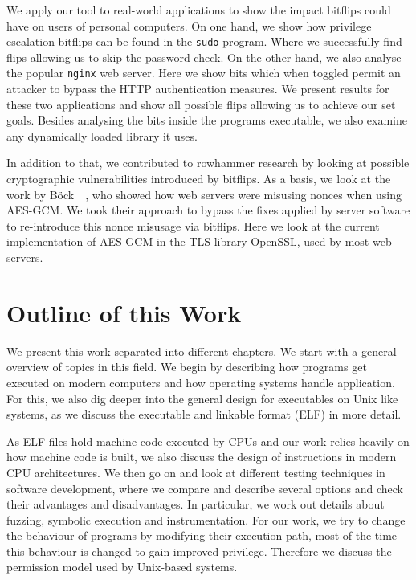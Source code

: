 We apply our tool to real-world applications to show the impact bitflips could
have on users of personal computers. On one hand, we show how privilege
escalation bitflips can be found in the \texttt{sudo} program. Where we
successfully find flips allowing us to skip the password check. On the other
hand, we also analyse the popular \texttt{nginx} web server. Here we show bits
which when toggled permit an attacker to bypass the HTTP authentication
measures. We present results for these two applications and show all possible
flips allowing us to achieve our set goals. Besides analysing the bits inside
the program\textquotesingle s executable, we also examine any dynamically loaded
library it uses.

In addition to that, we contributed to rowhammer research by looking at possible
cryptographic vulnerabilities introduced by bitflips. As a basis, we look at the
work by Böck~\etal~\cite{gcmnonceattack}, who showed how web servers were
misusing nonces when using AES-GCM. We took their approach to bypass the fixes
applied by server software to re-introduce this nonce misusage via bitflips.
Here we look at the current implementation of AES-GCM in the TLS library
OpenSSL, used by most web servers.

\section{Outline of this Work}

We present this work separated into different chapters. We start with a general
overview of topics in this field. We begin by describing how programs get
executed on modern computers and how operating systems handle application. For
this, we also dig deeper into the general design for executables on Unix like
systems, as we discuss the executable and linkable format (ELF) in more detail.

As ELF files hold machine code executed by CPUs and our work relies heavily on
how machine code is built, we also discuss the design of instructions in modern
CPU architectures.  We then go on and look at different testing techniques in
software development, where we compare and describe several options and check
their advantages and disadvantages. In particular, we work out details about
fuzzing, symbolic execution and instrumentation. For our work, we try to change
the behaviour of programs by modifying their execution path, most of the time
this behaviour is changed to gain improved privilege. Therefore we discuss the
permission model used by Unix-based systems.

